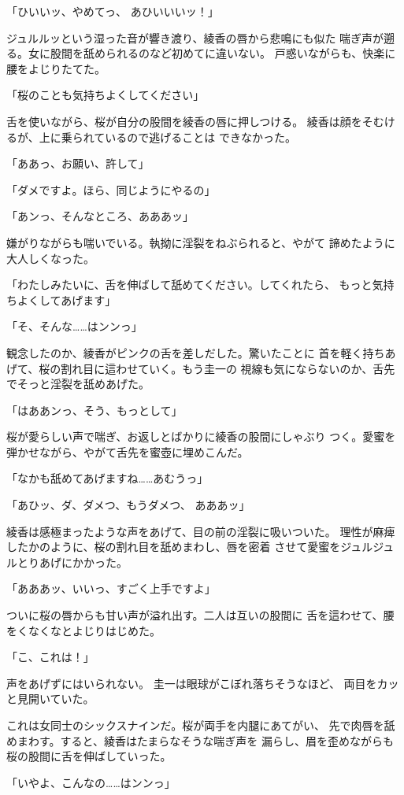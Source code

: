 ﻿\documentclass[
    book,tate,
    line_length=30zw,
    jafontsize=12pt,
    paper=b5j,
    landscape,
    ]{jlreq}
\begin{document}
「ひいいッ、やめてっ、 あひいいいッ！」

ジュルルッという湿った音が響き渡り、綾香の唇から悲鳴にも似た
喘ぎ声が遡る。女に股間を舐められるのなど初めてに違いない。
戸惑いながらも、快楽に腰をよじりたてた。

「桜のことも気持ちよくしてください」

舌を使いながら、桜が自分の股間を綾香の唇に押しつける。
綾香は顔をそむけるが、上に乗られているので逃げることは
できなかった。

「ああっ、お願い、許して」

「ダメですよ。ほら、同じようにやるの」

「あンっ、そんなところ、あああッ」

嫌がりながらも喘いでいる。執拗に淫裂をねぶられると、やがて
諦めたように大人しくなった。

「わたしみたいに、舌を伸ばして舐めてください。してくれたら、
もっと気持ちよくしてあげます」

「そ、そんな……はンンっ」

観念したのか、綾香がピンクの舌を差しだした。驚いたことに
首を軽く持ちあげて、桜の割れ目に這わせていく。もう圭一の
視線も気にならないのか、舌先でそっと淫裂を舐めあげた。

「はああンっ、そう、もっとして」

桜が愛らしい声で喘ぎ、お返しとばかりに綾香の股間にしゃぶり
つく。愛蜜を弾かせながら、やがて舌先を蜜壺に埋めこんだ。

「なかも舐めてあげますね……あむうっ」

「あひッ、ダ、ダメつ、もうダメつ、 あああッ」

綾香は感極まったような声をあげて、目の前の淫裂に吸いついた。
理性が麻痺したかのように、桜の割れ目を舐めまわし、唇を密着
させて愛蜜をジュルジュルとりあげにかかった。

「あああッ、いいっ、すごく上手ですよ」

ついに桜の唇からも甘い声が溢れ出す。二人は互いの股間に
舌を這わせて、腰をくなくなとよじりはじめた。

「こ、これは！」

声をあげずにはいられない。 圭一は眼球がこぼれ落ちそうなほど、
両目をカッと見開いていた。

これは女同士のシックスナインだ。桜が両手を内腿にあてがい、
先で肉唇を舐めまわす。すると、綾香はたまらなそうな喘ぎ声を
漏らし、眉を歪めながらも桜の股間に舌を伸ばしていった。

「いやよ、こんなの……はンンっ」
\end{document}
